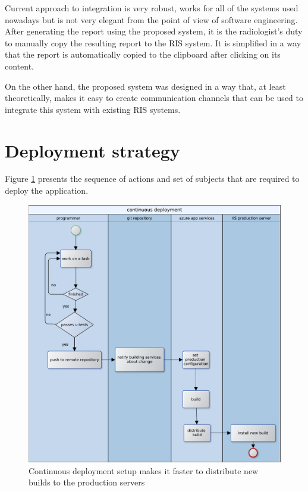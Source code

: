 \documentclass[12pt, twoside, openany]{report}
\theoremstyle{definition}
\begin{document}
Current approach to integration is very robust, works for all of the systems used nowadays but is not very elegant from the point of view of software engineering. 
After generating the report using the proposed system, it is the radiologist's duty to manually copy the resulting report to the RIS system. It is simplified in a way that the report is automatically copied to the clipboard after clicking on its content.

On the other hand, the proposed system was designed in a way that, at least theoretically, makes it easy to create communication channels that can be used to integrate this system with existing RIS systems. 

\section{Deployment strategy}

Figure \ref{fig:continuous-deployment} presents the sequence of actions and set of subjects that are required to deploy the application.
\begin{figure}
	\centering
	\includegraphics[width=\linewidth]{continuous-deployment}
	\caption{Continuous deployment setup makes it faster to distribute new builds to the production servers
		\label{fig:continuous-deployment}
	}
\end{figure}
\end{document}
